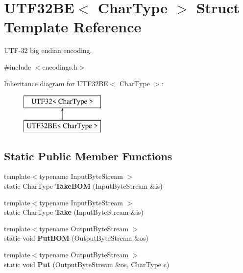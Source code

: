 \hypertarget{struct_u_t_f32_b_e}{}\section{U\+T\+F32\+BE$<$ Char\+Type $>$ Struct Template Reference}
\label{struct_u_t_f32_b_e}


U\+T\+F-\/32 big endian encoding.  




{\ttfamily \#include $<$encodings.\+h$>$}

Inheritance diagram for U\+T\+F32\+BE$<$ Char\+Type $>$\+:\begin{figure}[H]
\begin{center}
\leavevmode
\includegraphics[height=2.000000cm]{struct_u_t_f32_b_e}
\end{center}
\end{figure}
\subsection*{Static Public Member Functions}
\begin{DoxyCompactItemize}
\item 
{\footnotesize template$<$typename Input\+Byte\+Stream $>$ }\\static Char\+Type {\bfseries Take\+B\+OM} (Input\+Byte\+Stream \&is)\hypertarget{struct_u_t_f32_b_e_a07d228f51ad43ef83af2529ca4bd1181}{}\label{struct_u_t_f32_b_e_a07d228f51ad43ef83af2529ca4bd1181}

\item 
{\footnotesize template$<$typename Input\+Byte\+Stream $>$ }\\static Char\+Type {\bfseries Take} (Input\+Byte\+Stream \&is)\hypertarget{struct_u_t_f32_b_e_ace3086ece3b13417c758b5abcf3016c8}{}\label{struct_u_t_f32_b_e_ace3086ece3b13417c758b5abcf3016c8}

\item 
{\footnotesize template$<$typename Output\+Byte\+Stream $>$ }\\static void {\bfseries Put\+B\+OM} (Output\+Byte\+Stream \&os)\hypertarget{struct_u_t_f32_b_e_a8b1a216dd267ff06a9000cbe593ebd24}{}\label{struct_u_t_f32_b_e_a8b1a216dd267ff06a9000cbe593ebd24}

\item 
{\footnotesize template$<$typename Output\+Byte\+Stream $>$ }\\static void {\bfseries Put} (Output\+Byte\+Stream \&os, Char\+Type c)\hypertarget{struct_u_t_f32_b_e_ad270b8b016d477f7f7354df535fa28c5}{}\label{struct_u_t_f32_b_e_ad270b8b016d477f7f7354df535fa28c5}

\end{DoxyCompactItemize}
